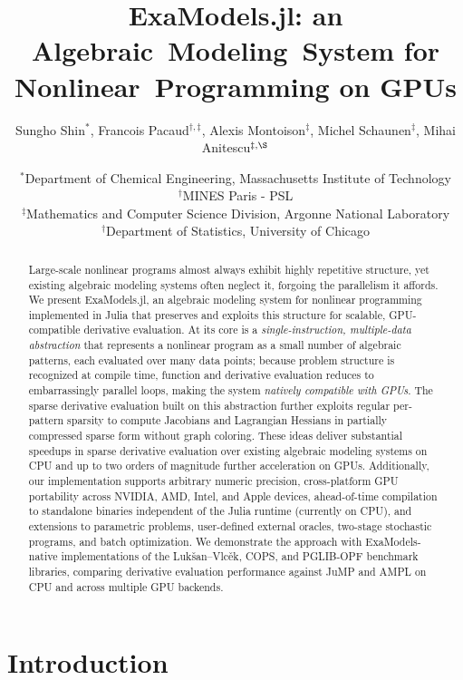 \documentclass[11pt]{article}
\title{ExaModels.jl: an Algebraic~Modeling~System for Nonlinear~Programming on GPUs}
\author{Sungho Shin$^*$, Francois Pacaud$^{\dag,\ddag}$, Alexis Montoison$^\ddag$, Michel Schaunen$^\ddag$, Mihai Anitescu$^{\ddag,\S}$}
\date{\small
  $^*$Department of Chemical Engineering, Massachusetts Institute of Technology\\
  $^\dag$MINES Paris - PSL\\
  $^\ddag$Mathematics and Computer Science Division, Argonne National Laboratory\\
  $^\dag$Department of Statistics, University of Chicago\\
}
\begin{document}
\maketitle
\begin{abstract}
  Large-scale nonlinear programs almost always exhibit highly repetitive structure, yet existing algebraic modeling systems often neglect it, forgoing the parallelism it affords. We present ExaModels.jl, an algebraic modeling system for nonlinear programming implemented in Julia that preserves and exploits this structure for scalable, GPU-compatible derivative evaluation. At its core is a \emph{single-instruction, multiple-data abstraction} that represents a nonlinear program as a small number of algebraic patterns, each evaluated over many data points; because problem structure is recognized at compile time, function and derivative evaluation reduces to embarrassingly parallel loops, making the system \emph{natively compatible with GPUs}. The sparse derivative evaluation built on this abstraction further exploits regular per-pattern sparsity to compute Jacobians and Lagrangian Hessians in partially compressed sparse form without graph coloring. These ideas deliver substantial speedups in sparse derivative evaluation over existing algebraic modeling systems on CPU and up to two orders of magnitude further acceleration on GPUs. Additionally, our implementation supports arbitrary numeric precision, cross-platform GPU portability across NVIDIA, AMD, Intel, and Apple devices, ahead-of-time compilation to standalone binaries independent of the Julia runtime (currently on CPU), and extensions to parametric problems, user-defined external oracles, two-stage stochastic programs, and batch optimization. We demonstrate the approach with ExaModels-native implementations of the Luk\v{s}an--Vlc\v{e}k, COPS, and PGLIB-OPF benchmark libraries, comparing derivative evaluation performance against JuMP and AMPL on CPU and across multiple GPU backends.
\end{abstract}



\section{Introduction}
\label{sec:intro}
\end{document}
